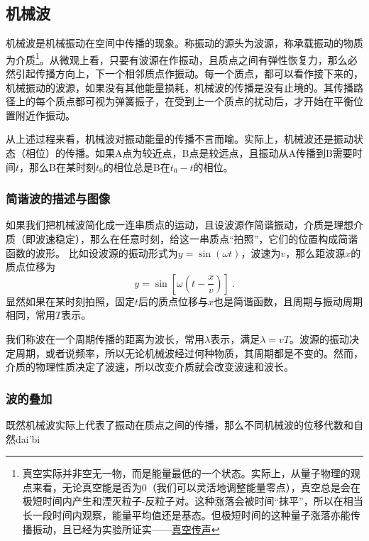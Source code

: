
\subsection{机械波}
机械波是机械振动在空间中传播的现象。称振动的源头为波源，称承载振动的物质为介质\footnote{真空实际并非空无一物，而是能量最低的一个状态。实际上，从量子物理的观点来看，无论真空能是否为0（我们可以灵活地调整能量零点），真空总是会在极短时间内产生和湮灭粒子-反粒子对。这种涨落会被时间“抹平”，所以在相当长一段时间内观察，能量平均值还是基态。但极短时间的这种量子涨落亦能传播振动，且已经为实验所证实——\href{https://www.rmzxw.com.cn/c/2023-08-25/3399291.shtml}{真空传声}}。从微观上看，只要有波源在作振动，且质点之间有弹性恢复力，那么必然引起传播方向上，下一个相邻质点作振动。每一个质点，都可以看作接下来的，机械振动的波源，如果没有其他能量损耗，机械波的传播是没有止境的。其传播路径上的每个质点都可视为弹簧振子，在受到上一个质点的扰动后，才开始在平衡位置附近作振动。

从上述过程来看，机械波对振动能量的传播不言而喻。实际上，机械波还是振动状态（相位）的传播。如果A点为较近点，B点是较远点，且振动从A传播到B需要时间$t$，那么B在某时刻$t_0$的相位总是B在$t_0-t$的相位。
\subsubsection{简谐波的描述与图像}
如果我们把机械波简化成一连串质点的运动，且设波源作简谐振动，介质是理想介质（即波速稳定），那么在任意时刻，给这一串质点“拍照”，它们的位置构成简谐函数的波形。
比如设波源的振动形式为$y=\sin(\omega t)$，波速为$v$，那么距波源$x$的质点位移为
\begin{equation}
y=\sin [\omega (t-\frac{x}{v})]~.
\end{equation}
显然如果在某时刻拍照，固定$t$后的质点位移与$x$也是简谐函数，且周期与振动周期相同，常用$T$表示。%

我们称波在一个周期传播的距离为波长，常用$\lambda $表示，满足$\lambda=vT$。波源的振动决定周期，或者说频率，所以无论机械波经过何种物质，其周期都是不变的。然而，介质的物理性质决定了波速，所以改变介质就会改变波速和波长。
\subsubsection{波的叠加}
既然机械波实际上代表了振动在质点之间的传播，那么不同机械波的位移代数和自然dai'bi